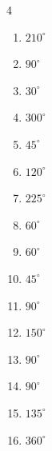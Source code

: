 \begin{multicols}{4}
\begin{enumerate}
\columnbreak %

  \item $\displaystyle 210^{\circ}$

  \item $\displaystyle 90^{\circ}$

  \item $\displaystyle 30^{\circ}$

  \item $\displaystyle 300^{\circ}$

  \item $\displaystyle 45^{\circ}$

  \item $\displaystyle 120^{\circ}$

  \item $\displaystyle 225^{\circ}$

  \item $\displaystyle 60^{\circ}$

  \item $\displaystyle 60^{\circ}$

  \item $\displaystyle 45^{\circ}$

  \item $\displaystyle 90^{\circ}$

  \item $\displaystyle 150^{\circ}$

  \item $\displaystyle 90^{\circ}$

  \item $\displaystyle 90^{\circ}$

  \item $\displaystyle 135^{\circ}$

  \item $\displaystyle 360^{\circ}$
        \phantom{$\displaystyle =2\pi$}


\end{enumerate}
\end{multicols}
